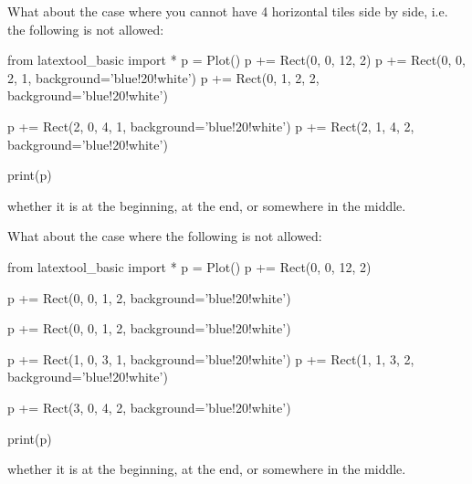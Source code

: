 \newpage
\begin{ex}
  What about the case where you cannot have 4 horizontal tiles side by side,
  i.e. the following is not allowed:
\begin{python}
from latextool_basic import *
p = Plot()
p += Rect(0, 0, 12, 2)
p += Rect(0, 0, 2, 1, background='blue!20!white')
p += Rect(0, 1, 2, 2, background='blue!20!white')

p += Rect(2, 0, 4, 1, background='blue!20!white')
p += Rect(2, 1, 4, 2, background='blue!20!white')

print(p)
\end{python}
whether it is at the beginning, at the end, or somewhere in the middle.
\end{ex}

\begin{ex}
  What about the case where the following is not allowed:
\begin{python}
from latextool_basic import *
p = Plot()
p += Rect(0, 0, 12, 2)

p += Rect(0, 0, 1, 2, background='blue!20!white')

p += Rect(0, 0, 1, 2, background='blue!20!white')

p += Rect(1, 0, 3, 1, background='blue!20!white')
p += Rect(1, 1, 3, 2, background='blue!20!white')

p += Rect(3, 0, 4, 2, background='blue!20!white')

print(p)
\end{python}
whether it is at the beginning, at the end, or somewhere in the middle.
\end{ex}
